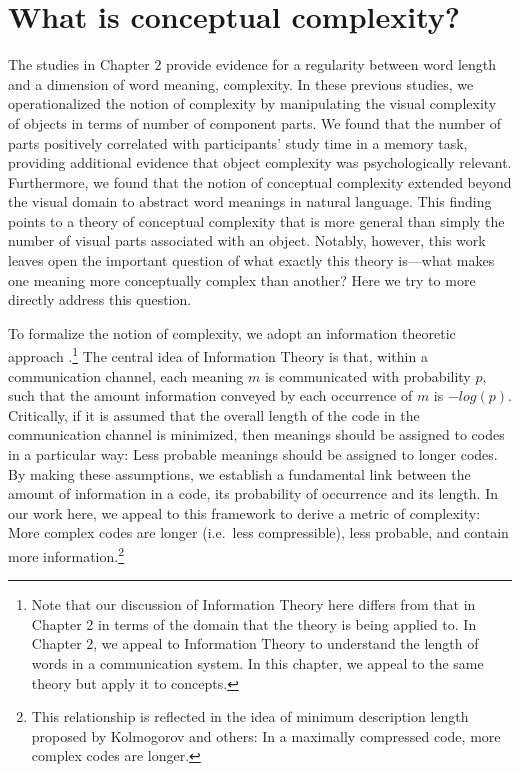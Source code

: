 
\chapter{What is conceptual complexity?}
\label{chapter:complexity}

The studies in Chapter 2 provide evidence for a regularity between word length and a dimension of word meaning, complexity. In these previous studies, we operationalized the notion of complexity by manipulating the visual complexity of objects in terms of number of component parts. We found that the number of parts  positively correlated with participants' study time in a memory task, providing additional evidence that object complexity was psychologically relevant. Furthermore, we found that the notion of conceptual complexity extended beyond the visual domain to abstract word meanings in natural language. This finding points to a theory of conceptual complexity that is more general than simply the number of visual parts associated with an object.  Notably, however, this work leaves open the important question of what exactly this theory is---what makes one meaning more conceptually complex than another? Here we try to more directly address this question. 

To formalize the notion of complexity, we adopt an information theoretic approach \cite{shannon1948}.\footnote{Note that our discussion of Information Theory here differs from that in Chapter 2 in terms of the domain that the theory is being applied to. In Chapter 2, we appeal to Information Theory to understand the length of words in a communication system. In this chapter, we appeal to the same theory but apply it to  concepts. } The central idea of Information Theory is that, within a communication channel, each meaning $m$ is communicated with probability $p$, such that the amount information conveyed by each occurrence of $m$ is $-log(p)$. Critically, if it is assumed that the overall length of the code in the communication channel is minimized, then meanings should be assigned to codes in a particular way: Less probable meanings should be assigned to longer codes. By making these assumptions, we establish a fundamental link between the amount of information in a code, its probability of occurrence and its length. In our work here, we appeal to this framework to derive a metric of complexity: More complex codes are longer (i.e.\ less compressible), less probable, and contain more information.\footnote{This relationship is reflected in the idea of minimum description length proposed by Kolmogorov and others: In a maximally compressed code, more complex codes are longer.}

